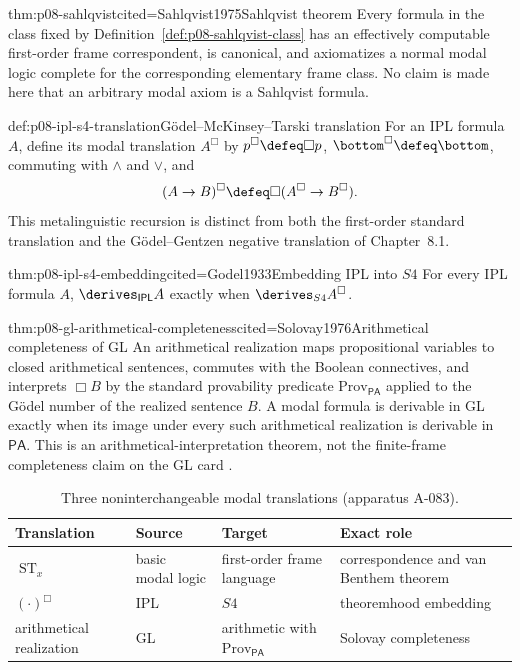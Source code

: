 \begin{hbtheorem}{thm:p08-sahlqvist}{cited=Sahlqvist1975}{Sahlqvist theorem}
Every formula in the class fixed by
Definition~\ref{def:p08-sahlqvist-class} has an effectively computable
first-order frame correspondent, is canonical, and axiomatizes a normal modal
logic complete for the corresponding elementary frame class.  No claim is
made here that an arbitrary modal axiom is a Sahlqvist formula.
\end{hbtheorem}

\begin{hbdefinition}{def:p08-ipl-s4-translation}{G\"odel--McKinsey--Tarski translation}
For an IPL formula \(A\), define its modal translation \(A^{\Box}\) by
\(p^{\Box}\defeq\Box p\), \(\bottom^{\Box}\defeq\bottom\), commuting with
\(\land\) and \(\lor\), and
\[
 (A\to B)^{\Box}\defeq\Box(A^{\Box}\to B^{\Box}).
\]
This metalinguistic recursion is distinct from both the first-order standard
translation and the G\"odel--Gentzen negative translation of Chapter~8.1.
\end{hbdefinition}

\begin{hbtheorem}{thm:p08-ipl-s4-embedding}{cited=Godel1933}{Embedding IPL into \(S4\)}
For every IPL formula \(A\),
\(\derives_{\mathsf{IPL}}A\) exactly when
\(\derives_{S4}A^{\Box}\).
\end{hbtheorem}

\begin{hbtheorem}{thm:p08-gl-arithmetical-completeness}{cited=Solovay1976}{Arithmetical completeness of GL}
An arithmetical realization maps propositional variables to closed
arithmetical sentences, commutes with the Boolean connectives, and interprets
\(\Box B\) by the standard provability predicate
\(\mathrm{Prov}_{\mathsf{PA}}\) applied to the G\"odel number of the realized
sentence \(B\).  A modal formula is derivable in GL exactly when its image
under every such arithmetical realization is derivable in \(\mathsf{PA}\).  This is an
arithmetical-interpretation theorem, not the finite-frame completeness claim on
the GL card \cite{Boolos1993}.
\end{hbtheorem}

\begin{table}[!htbp]
\centering
\small
\begin{tabular}{@{}p{}p{}p{}p{}@{}}
\toprule
Translation & Source & Target & Exact role \\
\midrule
\(\operatorname{ST}_x\) & basic modal logic & first-order frame language &
correspondence and van Benthem theorem \\
\((\cdot)^{\Box}\) & IPL & \(S4\) & theoremhood embedding \\
arithmetical realization & GL & arithmetic with \(\mathrm{Prov}_{\mathsf{PA}}\) &
Solovay completeness \\
\bottomrule
\end{tabular}
\caption{Three noninterchangeable modal translations (apparatus A-083).}
\label{tab:p08-modal-translations}
\end{table}

